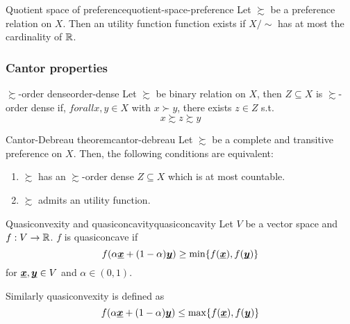 \documentclass[12pt]{extarticle}
\renewcommand{\vec}[1]{\uvec{#1}}
\begin{document}
\begin{theorem}{Quotient space of preference}{quotient-space-preference}
    Let $\succsim$ be a preference relation on $X$. Then an utility function function exists if $X/\sim$ has at most the cardinality of $\mathbb{R}$.
\end{theorem}

\subsubsection{Cantor properties}

\begin{definition}{$\succsim$-order dense}{order-dense}
    Let $\succsim$ be binary relation on $X$, then $Z \subseteq X$ is $\succsim$-order dense if, $forall x, y \in X$ with $x \succ y$, there exists $z \in Z$ s.t.
    \begin{equation}
        x \succsim z \succsim y
    \end{equation}
\end{definition}

\begin{theorem}{Cantor-Debreau theorem}{cantor-debreau}
    Let $\succsim$ be a complete and transitive preference on $X$.
    Then, the following conditions are equivalent:
    \begin{enumerate}[label=\roman*.]
        \item $\succsim$ has an $\succsim$-order dense $Z \subseteq X$ which is at most countable.
        \item $\succsim$ admits an utility function.
    \end{enumerate}
\end{theorem}

\begin{definition}{Quasiconvexity and quasiconcavity}{quasiconcavity}
    Let $V$ be a vector space and $f: V \to \mathbb{R}$.
    $f$ is quasiconcave if
    \begin{equation}
        f(\alpha \vec x + (1- \alpha) \vec y) \geq \min \{ f(\vec x), f(\vec y) \}
    \end{equation}
    for $\vec x, \vec y \in V$ and $\alpha \in (0,1)$.

    Similarly quasiconvexity is defined as
    \begin{equation}
        f(\alpha \vec x + (1- \alpha) \vec y) \leq \max \{ f(\vec x), f(\vec y) \}
    \end{equation}
\end{definition}
\end{document}
